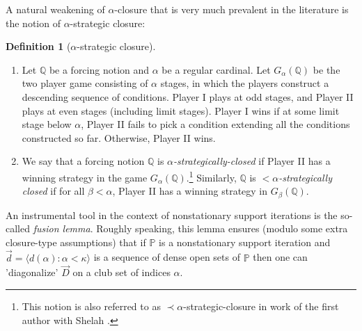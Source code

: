 \documentclass[11pt]{amsart}
\theoremstyle{definition}
\newtheorem{definition}[theorem]{Definition}
\newcounter{condition}
\theoremstyle{remark}
\newcommand\<{{<}}
\newcommand{\qo}{\mathbb{Q}}
\begin{document}
A natural weakening of $\alpha$-closure that is very much prevalent in the literature is the notion of $\alpha$-strategic closure:
\begin{definition}[$\alpha$-strategic closure]\label{def: modified strategic closure}\hfill
        \begin{enumerate}
            \item Let $\qo$ be a forcing notion and $\alpha$ be a regular cardinal. Let $G_\alpha(\qo)$ be the two player game consisting of $\alpha$ stages, in which the players construct a descending sequence of conditions. Player I plays at odd stages, and Player II plays at even stages (including limit stages). Player I wins if at some limit stage below $\alpha$, Player II fails to pick a condition extending all the conditions constructed so far. Otherwise, Player II wins.
            \item 
            We say that a forcing notion $\qo$ is \emph{$ \alpha$-strategically-closed} if Player II has a winning strategy in the game $G_{\alpha}(\qo)$.\footnote{This notion is also referred to as $\prec \alpha$-strategic-closure in work of the first author with Shelah \cite{ApterShelah}.} Similarly, $\mathbb{Q}$ is \emph{${<}\alpha$-strategically closed } if for all $\beta<\alpha$, Player II has a winning strategy in $G_\beta(\mathbb{Q})$.
        \end{enumerate}
    \end{definition}

\smallskip


An instrumental tool in the context of nonstationary support iterations is the so-called \emph{fusion lemma}. Roughly speaking, this lemma ensures (modulo some extra closure-type assumptions) that if $\mathbb{P}$ is a nonstationary support iteration and $\vec{d}=\langle d(\alpha) : \alpha <\kappa\rangle$ is a sequence of dense open sets of $\mathbb{P}$ then one can 'diagonalize' $\vec{D}$ on a club set of indices $\alpha$.  
\end{document}
